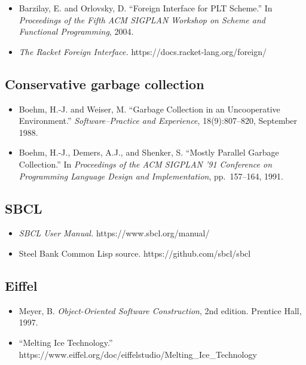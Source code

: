 \documentclass[
  12pt,
]{report}
\begin{document}
\begin{itemize}
\item
  Barzilay, E. and Orlovsky, D. ``Foreign Interface for PLT Scheme.'' In
  \emph{Proceedings of the Fifth ACM SIGPLAN Workshop on Scheme and
  Functional Programming}, 2004.
\item
  \emph{The Racket Foreign Interface.}
  https://docs.racket-lang.org/foreign/
\end{itemize}

\subsection{Conservative garbage
collection}\label{conservative-garbage-collection}

\begin{itemize}
\item
  Boehm, H.-J. and Weiser, M. ``Garbage Collection in an Uncooperative
  Environment.'' \emph{Software--Practice and Experience},
  18(9):807--820, September 1988.
\item
  Boehm, H.-J., Demers, A.J., and Shenker, S. ``Mostly Parallel Garbage
  Collection.'' In \emph{Proceedings of the ACM SIGPLAN '91 Conference
  on Programming Language Design and Implementation}, pp.~157--164,
  1991.
\end{itemize}

\subsection{SBCL}\label{sbcl}

\begin{itemize}
\item
  \emph{SBCL User Manual.} https://www.sbcl.org/manual/
\item
  Steel Bank Common Lisp source. https://github.com/sbcl/sbcl
\end{itemize}

\subsection{Eiffel}\label{eiffel}

\begin{itemize}
\item
  Meyer, B. \emph{Object-Oriented Software Construction}, 2nd edition.
  Prentice Hall, 1997.
\item
  ``Melting Ice Technology.''
  https://www.eiffel.org/doc/eiffelstudio/Melting\_Ice\_Technology
\end{itemize}
\end{document}

